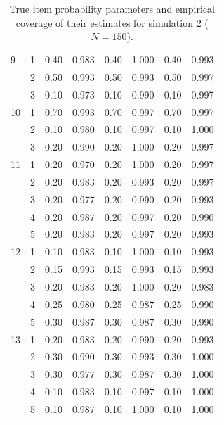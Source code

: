 \begin{table}[H]
\begin{tabular}{llcccccc}
  9 & 1 & 0.40 & 0.983 & 0.40 & 1.000 & 0.40 & 0.993 \\ 
   & 2 & 0.50 & 0.993 & 0.50 & 0.993 & 0.50 & 0.997 \\ 
   & 3 & 0.10 & 0.973 & 0.10 & 0.990 & 0.10 & 0.997 \\ 
  10 & 1 & 0.70 & 0.993 & 0.70 & 0.997 & 0.70 & 0.997 \\ 
   & 2 & 0.10 & 0.980 & 0.10 & 0.997 & 0.10 & 1.000 \\ 
   & 3 & 0.20 & 0.990 & 0.20 & 1.000 & 0.20 & 0.997 \\ 
  11 & 1 & 0.20 & 0.970 & 0.20 & 1.000 & 0.20 & 0.997 \\ 
   & 2 & 0.20 & 0.983 & 0.20 & 0.993 & 0.20 & 0.997 \\ 
   & 3 & 0.20 & 0.977 & 0.20 & 0.990 & 0.20 & 0.993 \\ 
   & 4 & 0.20 & 0.987 & 0.20 & 0.997 & 0.20 & 0.990 \\ 
   & 5 & 0.20 & 0.983 & 0.20 & 0.997 & 0.20 & 0.993 \\ 
  12 & 1 & 0.10 & 0.983 & 0.10 & 1.000 & 0.10 & 0.993 \\ 
   & 2 & 0.15 & 0.993 & 0.15 & 0.993 & 0.15 & 0.993 \\ 
   & 3 & 0.20 & 0.983 & 0.20 & 1.000 & 0.20 & 0.983 \\ 
   & 4 & 0.25 & 0.980 & 0.25 & 0.987 & 0.25 & 0.990 \\ 
   & 5 & 0.30 & 0.987 & 0.30 & 0.987 & 0.30 & 0.990 \\ 
  13 & 1 & 0.20 & 0.983 & 0.20 & 0.990 & 0.20 & 0.993 \\ 
   & 2 & 0.30 & 0.990 & 0.30 & 0.993 & 0.30 & 1.000 \\ 
   & 3 & 0.30 & 0.977 & 0.30 & 0.987 & 0.30 & 1.000 \\ 
   & 4 & 0.10 & 0.983 & 0.10 & 0.997 & 0.10 & 1.000 \\ 
   & 5 & 0.10 & 0.987 & 0.10 & 1.000 & 0.10 & 1.000 \\ 
   \bottomrule
\end{tabular}
\caption{True item probability parameters and empirical coverage of their estimates for simulation 2 ($N = 150$).} 
\label{table:sim2_item_prob_coverage_N150}
\end{table}
